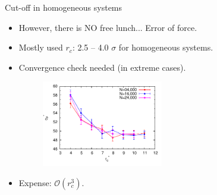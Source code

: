 \documentclass{beamer}
\newcommand{\redc}[1]{{\color{red} #1}}
\begin{document}
\begin{frame}{Cut-off in homogeneous systems}
  \begin{itemize}
  \item<1-> However, there is \redc{NO} free lunch... Error of force.
  \item<2-> Mostly used $r_c$: 2.5 -- 4.0 $\sigma$ for homogeneous systems.
  \item <3->\redc{Convergence check} needed (in extreme cases).
  \begin{figure}
      \centering
      \includegraphics[width=0.5\textwidth]{figs/simple-cut-conv/natom-rcut-c.pdf}
    \end{figure}
  \item<4-> Expense: \redc{$\mathcal O(r_c^3)$}.
  \end{itemize}
\end{frame}
\end{document}
